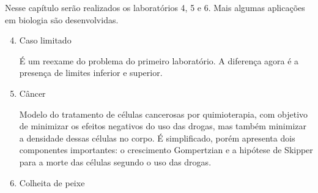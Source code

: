 Nesse capítulo serão realizados os laboratórios 4, 5 e 6. Mais algumas
aplicações em biologia são desenvolvidas.

\begin{enumerate}[label=\textbf{Lab \arabic*:}]
    \setcounter{enumi}{3}

    \item Caso limitado 
    
    É um reexame do problema do primeiro laboratório. A diferença agora é a
    presença de limites inferior e superior. 

    \item Câncer
    
    Modelo do tratamento de células cancerosas por quimioterapia, com objetivo
    de minimizar os efeitos negativos do uso das drogas, mas também minimizar
    a densidade dessas células no corpo. É simplificado, porém apresenta dois
    componentes importantes: o crescimento Gompertzian e a hipótese de Skipper
    para a morte das células segundo o uso das drogas. 

    \item Colheita de peixe  
    
 
\end{enumerate}